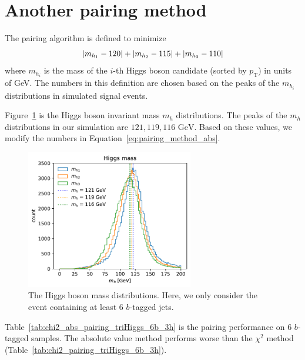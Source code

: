 \documentclass[12pt]{article}
\begin{document}
\section{Another pairing method}%
\label{sec:another_pairing_method}
	The pairing algorithm is defined to minimize
	\begin{equation}\label{eq:pairing_method_abs}
		\abs{m_{h_1} - 120} + \abs{m_{h_2} - 115} + \abs{m_{h_3} - 110}
	\end{equation}
	where $m_{h_i}$ is the mass of the $i$-th Higgs boson candidate (sorted by $p_{\text{T}}$) in units of GeV. The numbers in this definition are chosen based on the peaks of the $m_{h_i}$ distributions in simulated signal events.

	Figure~\ref{fig:mh_distribution_6b} is the Higgs boson invariant mass $m_h$ distributions. The peaks of the $m_{h}$ distributions in our simulation are $121, 119, 116 \text{ GeV}$. Based on these values, we modify the numbers in Equation~\ref{eq:pairing_method_abs}.
	\begin{figure}[htpb] 
		\centering
        \includegraphics[width=0.65\textwidth]{mh_distribution_6b.pdf} 
		\caption{The Higgs boson mass distributions. Here, we only consider the event containing at least 6 $b$-tagged jets.}
		\label{fig:mh_distribution_6b}
	\end{figure}
	Table~\ref{tab:chi2_abs_pairing_triHiggs_6b_3h} is the pairing performance on 6 $b$-tagged samples. The absolute value method performs worse than the $\chi^2$ method (Table~\ref{tab:chi2_pairing_triHiggs_6b_3h}).
\end{document}
